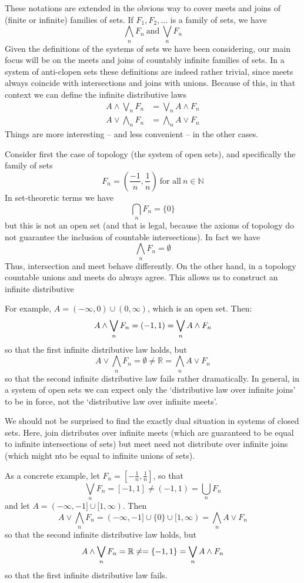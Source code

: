 \documentclass[oneside,english]{article}
\theoremstyle{plain}
\theoremstyle{definition}
\theoremstyle{definition}
\begin{document}
These notations are extended in the obvious way to cover meets and joins of (finite or infinite) families of sets. If $F_1, F_2, \dots$ is a family of sets, we have
\[
	\bigwedge_n F_n \ \text{and} \ \bigvee_n F_n
\]
Given the definitions of the systems of sets we have been considering, our main focus will be on the meets and joins of countably infinite families of sets. In a system of anti-clopen sets these definitions are indeed rather trivial, since meets always coincide with intersections and joins with unions. Because of this, in that context we can define the infinite distributive laws
\[
	\begin{split}
		A\land \bigvee_n F_n & = \bigvee_n A\land F_n \\
		A\lor \bigwedge_n F_n & = \bigwedge_n A\lor F_n 
	\end{split}
\]
Things are more interesting -- and less convenient -- in the other cases.

Consider first the case of topology (the system of open sets), and specifically the family of sets
\[
	F_n = (\frac{-1}{n}, \frac{1}{n}) \ \text{for all} \ n\in\mathbb{N}
\]
In set-theoretic terms we have
\[
	\bigcap_n F_n = \{0\}
\]
but this is not an open set (and that is legal, because the axioms of topology do not guarantee the inclusion of countable intersections). In fact we have
\[
\bigwedge_n F_n = \emptyset
\]
Thus, intersection and meet behave differently. On the other hand, in a topology countable unions and meets do always agree. This allows us to construct an infinite distributive

For example, $A = (-\infty, 0)\cup(0, \infty)$, which is an open set. Then:
\[
		A\land \bigvee_n F_n = (-1, 1) = \bigvee_n A\land F_n \\
\]
so that the first infinite distributive law holds, but
\[
		A\lor \bigwedge_n F_n = \emptyset \ne \mathbb{R} = \bigwedge_n A\lor F_n 
\]
so that the second infinite distributive law fails rather dramatically. In general, in a system of open sets we can expect only the `distributive law over infinite joins' to be in force, not the `distributive law over infinite meets'.

We should not be surprised to find the exactly dual situation in systems of closed sets. Here, join distributes over infinite meets (which are guaranteed to be equal to infinite intersections of sets) but meet need not distribute over infinite joins (which might nto be equal to infinite unions of sets).

As a concrete example, let $F_n = [-\frac{1}{n}, \frac{1}{n}]$, so that 
\[
	\bigvee_n F_n = [-1, 1]\ne (-1, 1) = \bigcup_n F_n
\]
and let $A = (-\infty, -1]\cup[1, \infty)$. Then
\[
	A\lor \bigwedge_n F_n = (-\infty, -1]\cup \{0\}\cup [1, \infty) = \bigwedge_n A\lor F_n 
\]
so that the second infinite distributive law holds, but
\[
	A\land \bigvee_n F_n = \mathbb{R} \ne  = \{-1, 1\} = \bigvee_n A\land F_n \\
\]
so that the first infinite distributive law fails.  
\end{document}
